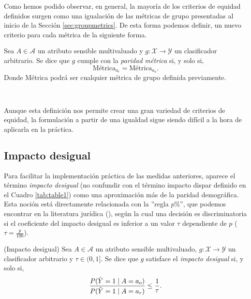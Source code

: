 \documentclass[oneside,openright,titlepage,numbers=noenddot,openany,headinclude,footinclude=true,
cleardoublepage=empty,abstractoff,BCOR=5mm,paper=a4,fontsize=12pt,main=spanish]{scrreprt}
\begin{document}
Como hemos podido observar, en general, la mayoría de los criterios de equidad definidos surgen como una igualación de las métricas de grupo presentadas al inicio de la Sección \ref{sec:groupmetrics}. De esta forma podemos definir, un nuevo criterio para cada métrica de la siguiente forma.\\

\begin{definition}\label{def:parmetr}
Sea $A \in \mathcal{A}$ un atributo sensible multivaluado y $g\colon \mathcal{X} \to \mathcal{Y}$ un clasificador arbitrario. Se dice que $g$ cumple con la \textit{paridad métrica} si, y solo si, $$\text{Métrica}_{a_r}=\text{Métrica}_{a_o}.$$
Donde Métrica podrá ser cualquier métrica de grupo definida previamente. 
\end{definition}\

Aunque esta definición nos permite crear una gran variedad de criterios de equidad, la formulación a partir de una igualdad sigue siendo difícil a la hora de aplicarla en la práctica. 

\subsection{Impacto desigual} \label{subsec:impactdesi}

Para facilitar la implementación práctica de las medidas anteriores, aparece el término \textit{impacto desigual} (no confundir con el término impacto dispar definido en el Cuadro \ref{tab:table1}) como una aproximación más de la paridad demográfica. Esta noción está directamente relacionada con la ''regla $p\%$'', que podemos encontrar en la literatura jurídica (\cite{prule2018}), según la cual una decisión es discriminatoria si el coeficiente del impacto desigual es inferior a un valor $\tau$ dependiente de $p$ ($\tau=\frac{p}{100}$).\\

\begin{definition}(Impacto desigual) \label{def:mdi}
Sea $A \in \mathcal{A}$ un atributo sensible multivaluado, $g\colon \mathcal{X} \to \mathcal{Y}$ un clasificador arbitrario y $\tau\in (0,1]$. Se dice que $g$ satisface el \textit{impacto desigual} si, y solo si,
\begin{equation} \label{eq:1p}
    \frac{\displaystyle P(\hat{Y}=1 \mid A=a_o)}{\displaystyle P(\hat{Y}=1 \mid A=a_r)}\leq \frac{1}{\tau}.
\end{equation}
\end{definition}\
\end{document}
